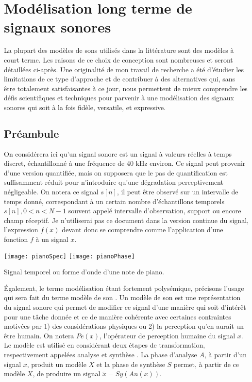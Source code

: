 \chapter{\nmu Modélisation long terme de signaux sonores} \label{chap:modeles}

La plupart des modèles de sons utilisés dans la littérature sont des modèles à court terme. Les raisons de ce choix de conception sont nombreuses et seront détaillées ci-après. Une originalité de mon travail de recherche a été d'étudier les limitations de ce type d'approche et de contribuer à des alternatives qui, sans être totalement satisfaisantes à ce jour, nous permettent de mieux comprendre les défis scientifiques et techniques pour parvenir à une modélisation des signaux sonores qui soit à la fois fidèle, versatile, et expressive.

\section{ \nmu Préambule}

On considérera ici qu'un signal sonore est un signal à valeurs réelles à temps discret, échantillonné à une fréquence de 40 kHz environ. Ce signal peut provenir d'une version quantifiée, mais on supposera que le pas de quantification est suffisamment réduit pour n'introduire qu'une dégradation perceptivement négligeable. On notera ce signal $s[n]$, il peut être observé sur un intervalle de temps donné, correspondant à un certain nombre d'échantillons temporels $s[n], 0<n<N-1$ souvent appelé intervalle d'observation, support ou encore champ réceptif. Je n'utiliserai pas ce document dans la version continue du signal, l'expression $f(x)$ devant donc se comprendre comme l'application d'une fonction $f$ à un signal $x$.

\begin{marginfigure}
  \texttt{[image: pianoSpec]}
  \texttt{[image: pianoPhase]}
  \caption{Signal temporel ou forme d'onde d'une note de piano.}
  \label{fig:onde}
\end{marginfigure}

Également, le terme modélisation étant fortement polysémique, précisons l'usage qui sera fait du terme \og modèle de son \fg. Un modèle de son est une représentation du signal sonore qui permet de modifier ce signal d'une manière qui soit d'intérêt pour une tâche donnée et ce de manière cohérente avec certaines contraintes motivées par 1) des considérations physiques ou 2) la perception qu'en aurait un être humain. On notera $Pe(x)$, l'opérateur de perception humaine du signal $x$.  Le modèle est utilisé en considérant deux étapes de transformation, respectivement appelées \og analyse \fg et \og synthèse \fg. La phase d'analyse $A$, à partir d'un signal $x$, produit un modèle $X$ et la phase de synthèse $S$ permet, à partir de ce modèle $X$, de produire un signal $\tilde{x}=Sy(An(x))$.

